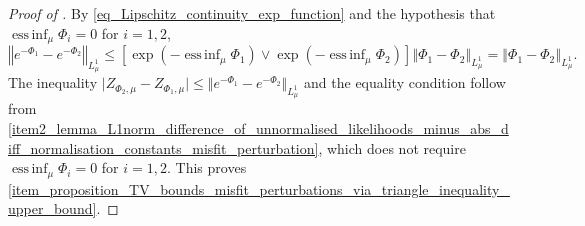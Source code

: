 \documentclass[a4paper]{scrartcl}
\theoremstyle{definition}
\numberwithin{equation}{section}
\DeclareMathOperator*{\essinf}{ess\,inf}
\newcommand{\abs}[1]{\vert #1\vert}
\newcommand{\norm}[1]{\Vert #1 \Vert}
\newcommand{\Norm}[1]{\left\Vert #1 \right\Vert}
\begin{document}
\begin{proof}[Proof of ]
   By \eqref{eq_Lipschitz_continuity_exp_function} and the hypothesis that $\essinf_\mu \Phi_i=0$ for $i=1,2$,
 \begin{equation*}
  \Norm{ e^{-\Phi_1}-e^{-\Phi_2}}_{L^1_\mu}\leq \left[\exp(-\essinf_\mu\Phi_1)\vee \exp(-\essinf_\mu\Phi_2)\right] \Norm{\Phi_1-\Phi_2}_{L^1_\mu}=\Norm{\Phi_1-\Phi_2}_{L^1_\mu}.
 \end{equation*}
 The inequality $\abs{Z_{\Phi_2,\mu}-Z_{\Phi_1,\mu}}\leq \norm{ e^{-\Phi_1}-e^{-\Phi_2}}_{L^1_\mu}$ and the equality condition follow from \ref{item2_lemma_L1norm_difference_of_unnormalised_likelihoods_minus_abs_diff_normalisation_constants_misfit_perturbation}, which does not require $\essinf_\mu\Phi_i=0$ for $i=1,2$.
  This proves \cref{item_proposition_TV_bounds_misfit_perturbations_via_triangle_inequality_upper_bound}.
  

\end{proof}
\end{document}

